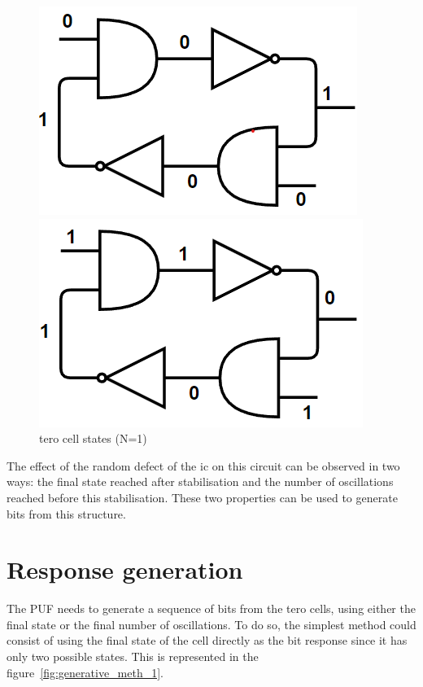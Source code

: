 \begin{figure}[H]
   \begin{minipage}[b]{0.50\linewidth} 
        \centering
        \includegraphics[width=0.6\linewidth]{images/tero_init_state.png}
   \end{minipage}\hfill
   \begin{minipage}[b]{0.50\linewidth}   
        \centering
        \includegraphics[width=0.6\linewidth]{images/tero_final_state.png}
   \end{minipage}
   \caption{\label{fig:ter_cell_states}\acrshort{tero} cell states (N=1)}
\end{figure}

The effect of the random defect of the \acrshort{ic} on this circuit can be observed in two ways: the final state reached after stabilisation and the number of oscillations reached before this stabilisation. These two properties can be used to generate bits from this structure.


\section{Response generation}
\label{sec:design_generation}


The PUF needs to generate a sequence of bits from the \acrshort{tero} cells, using either the final state or the final number of oscillations. To do so, the simplest method could consist of using the final state of the cell directly as the bit response since it has only two possible states. This is represented in the figure~\ref{fig:generative_meth_1}.\\

